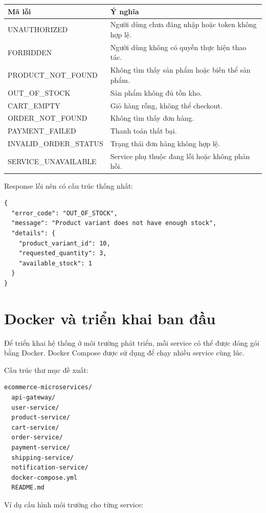 \begin{longtable}{|p{4cm}|p{9cm}|}
\hline
\textbf{Mã lỗi} & \textbf{Ý nghĩa} \\
\hline
UNAUTHORIZED & Người dùng chưa đăng nhập hoặc token không hợp lệ. \\
\hline
FORBIDDEN & Người dùng không có quyền thực hiện thao tác. \\
\hline
PRODUCT\_NOT\_FOUND & Không tìm thấy sản phẩm hoặc biến thể sản phẩm. \\
\hline
OUT\_OF\_STOCK & Sản phẩm không đủ tồn kho. \\
\hline
CART\_EMPTY & Giỏ hàng rỗng, không thể checkout. \\
\hline
ORDER\_NOT\_FOUND & Không tìm thấy đơn hàng. \\
\hline
PAYMENT\_FAILED & Thanh toán thất bại. \\
\hline
INVALID\_ORDER\_STATUS & Trạng thái đơn hàng không hợp lệ. \\
\hline
SERVICE\_UNAVAILABLE & Service phụ thuộc đang lỗi hoặc không phản hồi. \\
\hline
\end{longtable}

Response lỗi nên có cấu trúc thống nhất:

\begin{lstlisting}[style=code]
{
  "error_code": "OUT_OF_STOCK",
  "message": "Product variant does not have enough stock",
  "details": {
    "product_variant_id": 10,
    "requested_quantity": 3,
    "available_stock": 1
  }
}
\end{lstlisting}

\section{Docker và triển khai ban đầu}

Để triển khai hệ thống ở môi trường phát triển, mỗi service có thể được đóng gói bằng Docker. Docker Compose được sử dụng để chạy nhiều service cùng lúc.

Cấu trúc thư mục đề xuất:

\begin{verbatim}
ecommerce-microservices/
  api-gateway/
  user-service/
  product-service/
  cart-service/
  order-service/
  payment-service/
  shipping-service/
  notification-service/
  docker-compose.yml
  README.md
\end{verbatim}

Ví dụ cấu hình môi trường cho từng service:

